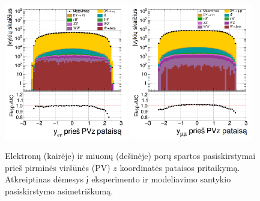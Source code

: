 \documentclass[a4paper, 12pt, oneside]{article}
\begin{document}
\begin{figure}[H]
	\includegraphics[width=0.48\textwidth]{ee_rapi_beforePVZ.png}
	\includegraphics[width=0.48\textwidth]{mumu_rapi_beforePVZ.png}
	\caption{\label{fig:rapibPVZ} Elektronų (kairėje) ir miuonų (dešinėje) porų spartos pasiskirstymai
		prieš pirminės viršūnės (PV) $z$ koordinatės pataisos pritaikymą.
		Atkreiptinas dėmesys į eksperimento ir modeliavimo santykio pasiskirstymo asimetriškumą.}
\end{figure}
\end{document}
